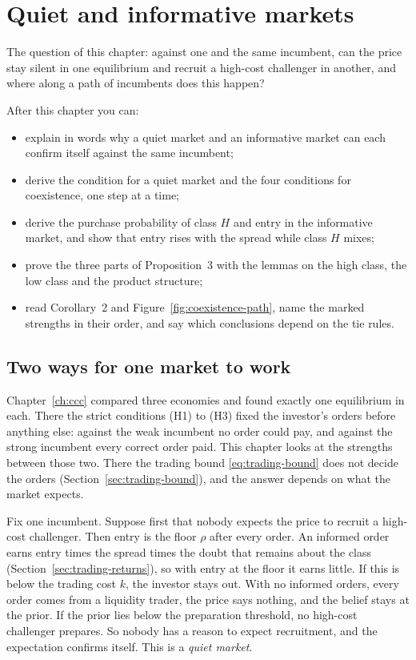 \chapter{Quiet and informative markets}\label{ch:coexistence}

\begin{chapterplan}
The question of this chapter: against one and the same incumbent, can the price stay silent in one equilibrium and
recruit a high-cost challenger in another, and where along a path of incumbents does this happen?

After this chapter you can:
\begin{itemize}
\item explain in words why a quiet market and an informative market can each confirm itself against the same
incumbent;
\item derive the condition for a quiet market and the four conditions for coexistence, one step at a time;
\item derive the purchase probability of class \(H\) and entry in the informative market, and show that entry rises
with the spread while class \(H\) mixes;
\item prove the three parts of Proposition~3 with the lemmas on the high class, the low class and the product
structure;
\item read Corollary~2 and Figure~\ref{fig:coexistence-path}, name the marked strengths in their order, and say which
conclusions depend on the tie rules.
\end{itemize}
\end{chapterplan}

\section{Two ways for one market to work}\label{sec:coexistence-words}

Chapter~\ref{ch:ccc} compared three economies and found exactly one equilibrium in each. There the strict
conditions (H1) to (H3) fixed the investor's orders before anything else: against the weak incumbent no order could
pay, and against the strong incumbent every correct order paid. This chapter looks at the strengths between those
two. There the trading bound \eqref{eq:trading-bound} does not decide the orders (Section~\ref{sec:trading-bound}),
and the answer depends on what the market expects.

Fix one incumbent. Suppose first that nobody expects the price to recruit a high-cost challenger. Then entry is the
floor \(\rho\) after every order. An informed order earns entry times the spread times the doubt that remains about
the class (Section~\ref{sec:trading-returns}), so with entry at the floor it earns little. If this is below the
trading cost \(k\), the investor stays out. With no informed orders, every order comes from a liquidity trader, the
price says nothing, and the belief stays at the prior. If the prior lies below the preparation threshold, no
high-cost challenger prepares. So nobody has a reason to expect recruitment, and the expectation confirms itself.
This is a \emph{quiet market}.

